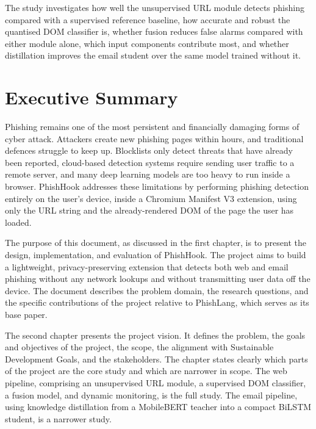 \documentclass{FastFyp}
\begin{document}
The study investigates how well the unsupervised URL module detects phishing compared with a supervised reference baseline, how accurate and robust the quantised DOM classifier is, whether fusion reduces false alarms compared with either module alone, which input components contribute most, and whether distillation improves the email student over the same model trained without it. 

\vspace{0.5em}



\pagebreak

\section*{Executive Summary}
Phishing remains one of the most persistent and financially damaging forms of cyber attack. Attackers create new phishing pages within hours, and traditional defences struggle to keep up. Blocklists only detect threats that have already been reported, cloud-based detection systems require sending user traffic to a remote server, and many deep learning models are too heavy to run inside a browser. PhishHook addresses these limitations by performing phishing detection entirely on the user's device, inside a Chromium Manifest V3 extension, using only the URL string and the already-rendered DOM of the page the user has loaded.

The purpose of this document, as discussed in the first chapter, is to present the design, implementation, and evaluation of PhishHook. The project aims to build a lightweight, privacy-preserving extension that detects both web and email phishing without any network lookups and without transmitting user data off the device. The document describes the problem domain, the research questions, and the specific contributions of the project relative to PhishLang, which serves as its base paper.

The second chapter presents the project vision. It defines the problem, the goals and objectives of the project, the scope, the alignment with Sustainable Development Goals, and the stakeholders. The chapter states clearly which parts of the project are the core study and which are narrower in scope. The web pipeline, comprising an unsupervised URL module, a supervised DOM classifier, a fusion model, and dynamic monitoring, is the full study. The email pipeline, using knowledge distillation from a MobileBERT teacher into a compact BiLSTM student, is a narrower study.
\end{document}
